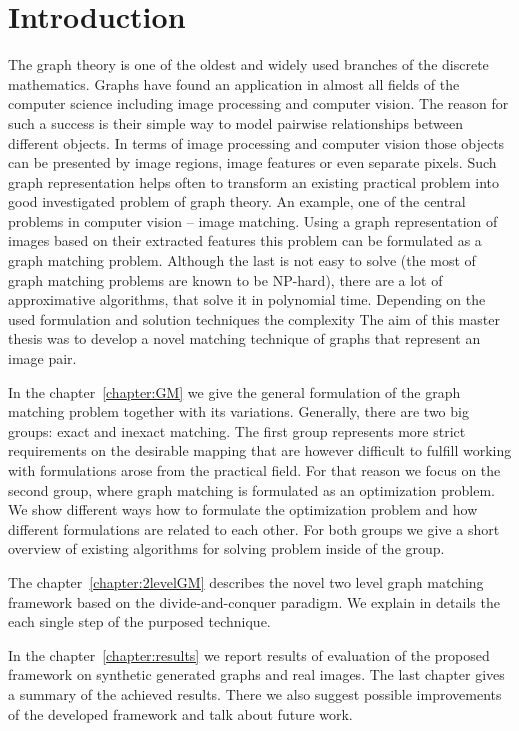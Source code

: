 \chapter{Introduction}
The graph theory is one of the oldest and widely used branches of the discrete mathematics. Graphs have found an application in almost all fields of the computer science including image processing and computer vision. The reason for such a success is their simple way to model pairwise relationships between different objects. In terms of image processing and computer vision those objects can be presented by image regions, image features or even separate pixels. Such graph representation helps often to transform an existing practical problem into good investigated problem of graph theory. An example, one of the central problems in computer vision -- image matching. %
Using a graph representation of images based on their extracted features this problem can be formulated as a graph matching problem. Although the last is not easy to solve (the most of graph matching problems are known to be NP-hard), there are a lot of approximative algorithms, that solve it in polynomial time.
Depending on the used formulation and solution techniques the complexity
The aim of this master thesis was to develop a novel matching technique of graphs that represent an image pair.

In the chapter~\ref{chapter:GM} we give the general formulation of the graph matching problem together with its variations. Generally, there are two big groups: exact and inexact matching. The first group represents more strict requirements on the desirable mapping that are however difficult to fulfill working with formulations arose from the practical field. For that reason we focus on the second group, where graph matching is formulated as an optimization problem.  We show different ways how to formulate the optimization problem and how different formulations are related to each other.
For both groups we give a short overview of existing algorithms for solving problem inside of the group.

The chapter~\ref{chapter:2levelGM} describes the novel two level graph matching framework based on the divide-and-conquer paradigm. We explain in details the each single step of the purposed technique. 

In the chapter~\ref{chapter:results} we report results of evaluation of the proposed framework on synthetic generated graphs and real images. The last chapter gives a summary of the achieved results. There we also suggest possible improvements of the developed framework and talk about future work.

